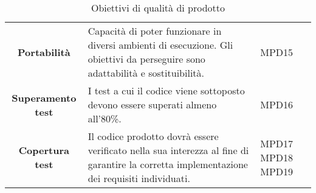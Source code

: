 \begin{table}[H]
\begin{tabular}{c|p{8cm}|p{2cm}}
    \textbf{Portabilità} & Capacità di poter funzionare in diversi ambienti di esecuzione. Gli obiettivi da perseguire sono adattabilità e sostituibilità. & MPD15\\
    \textbf{Superamento test} & I test a cui il codice viene sottoposto devono essere superati almeno all’80\%. & MPD16\\
    \textbf{Copertura test} & Il codice prodotto dovrà essere verificato nella sua interezza al fine di garantire la corretta implementazione dei requisiti individuati.& MPD17 MPD18 MPD19\\
  \end{tabular}
  \caption{Obiettivi di qualità di prodotto}
\end{table}


